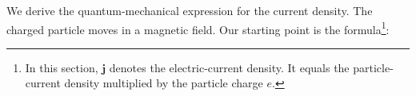 We derive the quantum-mechanical expression for the current density.
The charged particle moves in a magnetic field.
Our starting point is the formula\footnote{In this section, $\mathbf j$ denotes
the electric-current density. It equals the particle-current density multiplied
by the particle charge $e$.}:
